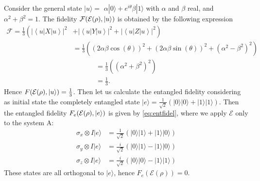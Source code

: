 Consider the general state $|u\rangle=$ $\alpha|0\rangle+e^{i \theta} \beta|1\rangle$ with $\alpha$ and $\beta$ real, and $\alpha^{2}+\beta^{2}=1$. The fidelity $\mathcal{F}(\mathcal{E}(\rho), \ket{u})$ is obtained by the following expression
$$
\begin{aligned}
\mathcal{F}=\frac{1}{3}\left(\left|\left\langle u\left|X\right| u\right\rangle\right|^{2}\right.&\left.+\left|\left\langle u\left|Y\right| u\right\rangle\right|^{2}+\left|\left\langle u\left|Z\right| u\right\rangle\right|^{2}\right) \\
&=\frac{1}{3}\left((2 \alpha \beta \cos (\theta))^{2}+(2 \alpha \beta \sin (\theta))^{2}+\left(\alpha^{2}-\beta^{2}\right)^{2}\right)
\end{aligned}
$$
$$
\begin{array}{l}
=\frac{1}{3}\left(\left(\alpha^{2}+\beta^{2}\right)^{2}\right) \\
=\frac{1}{3} .
\end{array}
$$
Hence $F(\mathcal{E}(\rho),\ket{u})=\frac{1}{3}$. Then let us calculate the entangled fidelity considering as initial state the completely entangled state $|e\rangle=\frac{1}{\sqrt{2}}(|0\rangle|0\rangle+|1\rangle|1\rangle) .$
Then the entangled fidelity $F_{e}(\mathcal{E}(\rho),\ket{e})$ is given by \ref{eq:entfidel}, where we apply $\mathcal{E}$ only to the system A: 
$$
\begin{aligned}
 \sigma_{x} \otimes I|e\rangle &=\frac{1}{\sqrt{2}}(|0\rangle|1\rangle+|1\rangle|0\rangle) \\
\sigma_{y} \otimes I|e\rangle &=\frac{i}{\sqrt{2}}(|0\rangle|1\rangle-|1\rangle|0\rangle) \\
\sigma_{z} \otimes I|e\rangle &=\frac{i}{\sqrt{2}}(|0\rangle|0\rangle-|1\rangle|1\rangle)
\end{aligned}
$$
These states are all orthogonal to $|e\rangle$, hence $F_{e}(\mathcal{E}(\rho))=0$.